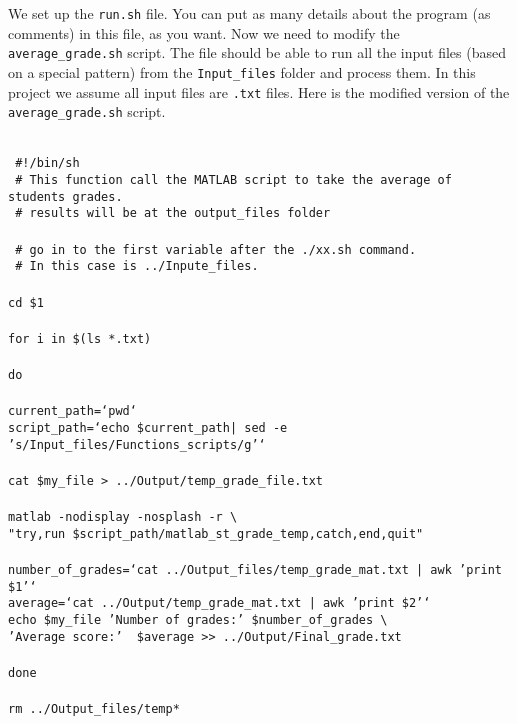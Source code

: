 \vspace{5mm}
\noindent
We set up the \texttt{run.sh} file. You can put as many details about the program (as comments) in this file, as you want. Now we need to modify the \texttt{average\_grade.sh} script. The file should be able to run all the input files (based on a special pattern) from the \texttt{Input\_files} folder and process them. In this project we assume all input files are \texttt{.txt} files. Here is the modified version of the \texttt{average\_grade.sh} script.
\vspace{5mm} 
\begin{mdframed}[hidealllines=true,backgroundcolor=gray!20]
\begin{singlespace}
\fontsize{10pt}{1pt}
\texttt{
\\
{ \color{matlab_green} \#!/bin/sh}\\
{ \color{matlab_green} \# This function call the MATLAB script to take the average of students grades.}\\
{ \color{matlab_green} \# results will be at the output\_files folder}\\
\\
{ \color{matlab_green} \# go in to the first variable after the ./xx.sh command.}\\
{ \color{matlab_green} \# In this case is ../Inpute\_files.}\\
\\
cd \$1\\
\\
{\color{for_pink}for} i {\color{for_pink}in} \$(ls *.txt)\\
\\
{\color{for_pink}do}\\
\\
current\_path={\color{red}`pwd`}\\
script\_path={\color{red}`echo \$current\_path| sed -e 's/Input\_files/Functions\_scripts/g'`}\\
\\
cat \$my\_file > ../Output/temp\_grade\_file.txt\\
\\
matlab -nodisplay -nosplash -r   \textbackslash \\
{\color{red}"try,run \$script\_path/matlab\_st\_grade\_temp,catch,end,quit"}\\
\\
number\_of\_grades={\color{red}`cat ../Output\_files/temp\_grade\_mat.txt | awk '{print \$1}'`}\\
average={\color{red}`cat ../Output/temp\_grade\_mat.txt | awk '{print \$2}'`}\\
echo \$my\_file {\color{red}'Number of grades:'}  \$number\_of\_grades \textbackslash \\
\phantom{x}\hspace{14ex} {\color{red}'Average score:'} \  \$average >> ../Output/Final\_grade.txt \\
\\
{\color{for_pink}done}\\
\\
rm ../Output\_files/temp*  \\  
 }
\end{singlespace}
\end{mdframed}

